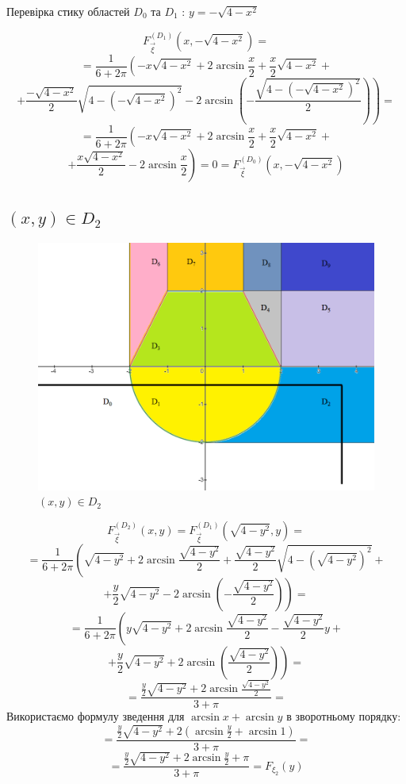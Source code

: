 \documentclass[14pt, a4paper, ukrainian]{extreport}
\begin{document}
	Перевірка стику областей $D_0$ та $D_1$ : $ y = -\sqrt{4-x^2}$
	
	$$ F_{\vec\xi}^{\left({D_1}\right)}(x, -\sqrt{4-x^2}) = 
	$$
	$$ = \frac{1}{6+2\pi} \left(-x\sqrt{4-x^2} + 2\arcsin\frac{x}{2} + \frac{x}{2}\sqrt{4-x^2}+ \right.
	$$
	$$ \left.+ \dfrac{-\sqrt{4-x^2}}{2}\sqrt{4-\left(-\sqrt{4-x^2}\right)^2} - 2\arcsin{\left(-\frac{\sqrt{4-\left(-\sqrt{4-x^2}\right)^2}}{2}\right)}\right) = 
	$$
	$$ = \frac{1}{6+2\pi} \left(-x\sqrt{4-x^2} + 2\arcsin\frac{x}{2} + \frac{x}{2}\sqrt{4-x^2}+ \right.
	$$
	$$ \left.+ \dfrac{x\sqrt{4-x^2}}{2} - 2\arcsin{\frac{x}{2}}\right) = 0 = F_{\vec\xi}^{\left({D_0}\right)}(x, -\sqrt{4-x^2})
	$$
	
	\subsection{$(x, y) \in D_2 $}
	
	\begin{figure}[H]
		\centering
		\includegraphics[width=\textwidth]{./Image/Im_13_D_2.png}
		\caption{$(x, y) \in D_2 $}
		\label{im:D_2}
	\end{figure}
	
	$$ F_{\vec \xi}^{\left(D_2\right)}(x, y) = F_{\vec \xi}^{\left(D_1\right)}(\sqrt{4-y^2}, y) = 
	$$
	$$ = \dfrac{1}{6+2\pi}\left(\sqrt{4-y^2} + 2\arcsin\frac{\sqrt{4-y^2}}{2} + \frac{\sqrt{4-y^2}}{2}\sqrt{4-(\sqrt{4-y^2})^2} + \right. 
	$$
	$$ \left. + \dfrac{y}{2}\sqrt{4-y^2} - 2\arcsin{\left(-\frac{\sqrt{4-y^2}}{2}\right)}\right) = 
	$$
	$$ = \dfrac{1}{6+2\pi}\left(y\sqrt{4-y^2} + 2\arcsin\frac{\sqrt{4-y^2}}{2} - \frac{\sqrt{4-y^2}}{2}y + \right. 
	$$
	$$ \left. + \dfrac{y}{2}\sqrt{4-y^2} + 2\arcsin{\left(\frac{\sqrt{4-y^2}}{2}\right)}\right) = 
	$$
	$$ = \dfrac{\frac{y}{2}\sqrt{4-y^2} + 2\arcsin\frac{\sqrt{4-y^2}}{2}}{3+\pi} = 
	$$
	Використаємо формулу зведення для $\arcsin{x} + \arcsin{y}$ в зворотньому порядку:
	$$ = \dfrac{\frac{y}{2}\sqrt{4-y^2} + 2\left(\arcsin\frac{y}{2} + \arcsin{1}\right)}{3+\pi} = 
	$$
	$$ = \dfrac{\frac{y}{2}\sqrt{4-y^2} + 2\arcsin\frac{y}{2} + \pi}{3+\pi} = F_{\xi_2} (y)
	$$
	
\end{document}
